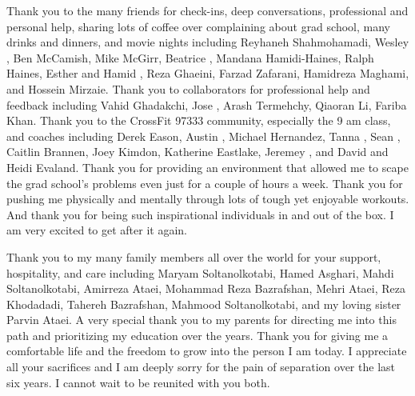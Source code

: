 %
Thank you to the many friends for 
check-ins, deep conversations, professional and personal help, sharing lots of coffee over complaining about grad school, many drinks and dinners, and movie nights 
including
 Reyhaneh Shahmohamadi, Wesley ,
 Ben McCamish,  Mike McGirr, 
Beatrice , Mandana Hamidi-Haines, Ralph Haines, 
Esther and Hamid , Reza Ghaeini, Farzad Zafarani, Hamidreza Maghami, and Hossein Mirzaie.
Thank you to collaborators for professional help and feedback including
Vahid Ghadakchi, Jose , Arash Termehchy, Qiaoran Li, Fariba Khan.
Thank you to the CrossFit 97333 community, especially the 9 am class, 
and coaches including Derek Eason, Austin ,
Michael Hernandez, Tanna , Sean , Caitlin Brannen, Joey Kimdon, 
Katherine Eastlake, Jeremey , and David and Heidi Evaland.
Thank you for providing an environment that 
allowed me to scape the grad school's problems even just for a couple of hours a week. Thank you
for pushing me physically and mentally through lots of tough yet enjoyable workouts. And thank you
for being such inspirational individuals in and out of the box.
I am very excited to get after it again.
%
%

Thank you to my many family members all over the world for your support, hospitality, and care
including Maryam Soltanolkotabi, Hamed Asghari, Mahdi Soltanolkotabi, Amirreza Ataei, 
Mohammad Reza Bazrafshan, Mehri Ataei, Reza Khodadadi, Tahereh Bazrafshan, 
Mahmood Soltanolkotabi, and my loving sister Parvin Ataei. A very special thank you
to my parents for directing me into this path and prioritizing my education over the years. 
Thank you for giving me a comfortable life and the freedom to grow into the person I am today.
I appreciate all your sacrifices and I am deeply sorry for the pain of separation over the last six 
years. I cannot wait to be reunited with you both.


